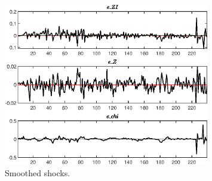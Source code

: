  
\begin{figure}[H]
\centering 
\includegraphics[width=0.80\textwidth]{two_sector_RBC_mobile/graphs/two_sector_RBC_mobile_SmoothedShocks1}
\caption{Smoothed shocks.}\label{Fig:SmoothedShocks:1}
\end{figure}


